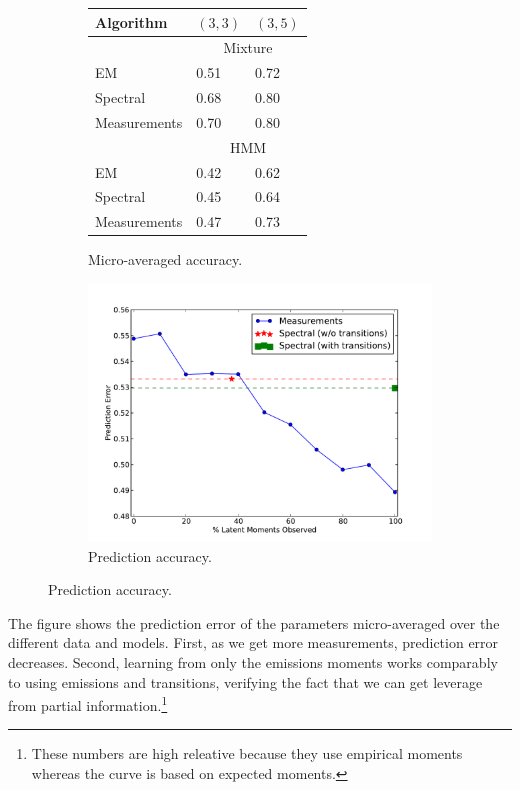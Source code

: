\begin{figure}
  \centering
  \begin{subfigure}[b]{0.4\textwidth}
    \begin{tabular}{l | l l }
        Algorithm & $(3,3)$ & $(3,5)$ \\ \hline
        & \multicolumn{2}{c}{Mixture} \\
        EM                    & 0.51 & 0.72 \\
        Spectral              & 0.68 & 0.80 \\
        Measurements  & 0.70 & 0.80 \\
        & \multicolumn{2}{c}{HMM} \\
        EM                    & 0.42 & 0.62  \\
        Spectral              & 0.45 & 0.64  \\
        Measurements  & 0.47 & 0.73
    \end{tabular}
    \caption{Micro-averaged accuracy.}
    \label{tab:errors}
  \end{subfigure}
  \begin{subfigure}[b]{0.4\textwidth}
    \includegraphics[width=1.0\textwidth]{figures/measurements.pdf}
    \caption{Prediction accuracy.}
    \label{fig:measurements}
  \end{subfigure}
\end{figure}


The figure
shows the prediction error of the parameters
micro-averaged over the different data and models.  First, as we get more
measurements, prediction error decreases.  Second,
learning from only the emissions moments works comparably
to using emissions and transitions, verifying the fact that
we can get leverage from partial information.\footnote{
These numbers are high releative because they use empirical moments
whereas the curve is based on expected moments.}

